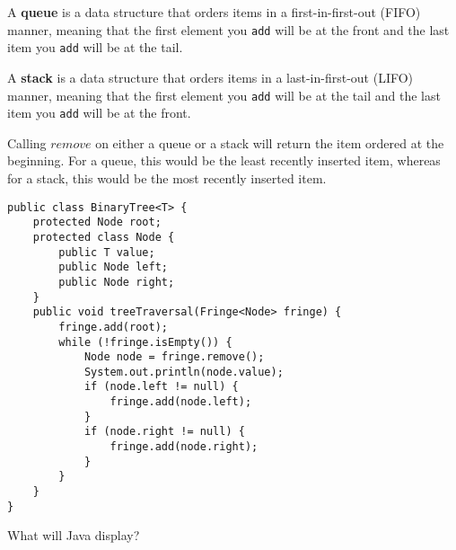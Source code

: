 \question
A \textbf{queue} is a data structure that orders items in a first-in-first-out (FIFO) manner, meaning that the first element you \lstinline$add$ will be at the front and the last item you \lstinline$add$ will be at the tail.   

A \textbf{stack} is a data structure that orders items in a last-in-first-out (LIFO) manner, meaning that the first element you \lstinline$add$ will be at the tail and the last item you \lstinline$add$ will be at the front.

Calling $remove$ on either a queue or a stack will return the item ordered at the beginning.  For a queue, this would be the least recently inserted item, whereas for a stack, this would be the most recently inserted item.

\begin{lstlisting}
public class BinaryTree<T> {
    protected Node root;
    protected class Node {
        public T value;
        public Node left;
        public Node right;
    }
    public void treeTraversal(Fringe<Node> fringe) {
        fringe.add(root);
        while (!fringe.isEmpty()) {
            Node node = fringe.remove();
            System.out.println(node.value);
            if (node.left != null) {
                fringe.add(node.left);
            }
            if (node.right != null) {
                fringe.add(node.right);
            }
        }
    }
}
\end{lstlisting}


What will Java display?

